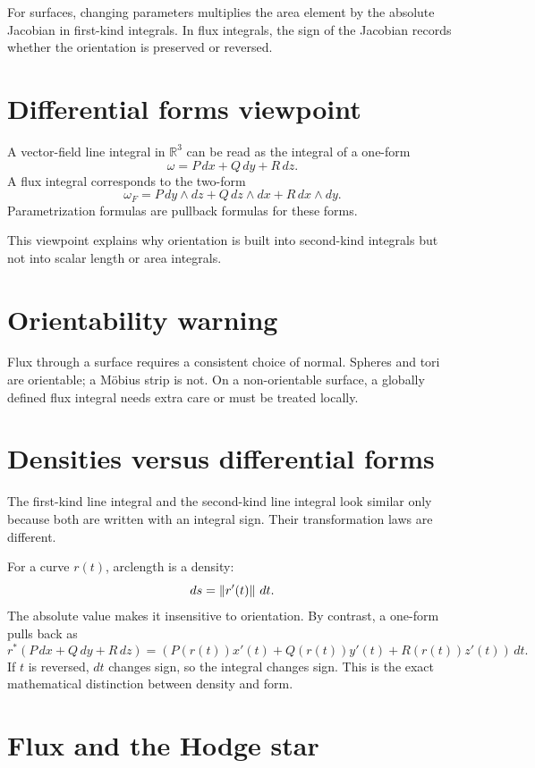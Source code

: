 For surfaces, changing parameters multiplies the area element by the absolute Jacobian in first-kind integrals.  In flux integrals, the sign of the Jacobian records whether the orientation is preserved or reversed.

\section{Differential forms viewpoint}

A vector-field line integral in \(\mathbb R^3\) can be read as the integral of a one-form
\[
  \omega=P\,dx+Q\,dy+R\,dz.
\]
A flux integral corresponds to the two-form
\[
  \omega_F=P\,dy\wedge dz+Q\,dz\wedge dx+R\,dx\wedge dy.
\]
Parametrization formulas are pullback formulas for these forms.

This viewpoint explains why orientation is built into second-kind integrals but not into scalar length or area integrals.

\section{Orientability warning}

Flux through a surface requires a consistent choice of normal.  Spheres and tori are orientable; a Möbius strip is not.  On a non-orientable surface, a globally defined flux integral needs extra care or must be treated locally.

\section{Densities versus differential forms}

The first-kind line integral and the second-kind line integral look similar only because both are written with an integral sign.  Their transformation laws are different.

For a curve \(r(t)\), arclength is a density:
\[
  ds=\left\lVert r'(t) \right\rVert\,dt.
\]
The absolute value makes it insensitive to orientation.  By contrast, a one-form pulls back as
\[
  r^*(P\,dx+Q\,dy+R\,dz)
  =(P(r(t))x'(t)+Q(r(t))y'(t)+R(r(t))z'(t))\,dt.
\]
If \(t\) is reversed, \(dt\) changes sign, so the integral changes sign.  This is the exact mathematical distinction between density and form.

\section{Flux and the Hodge star}

